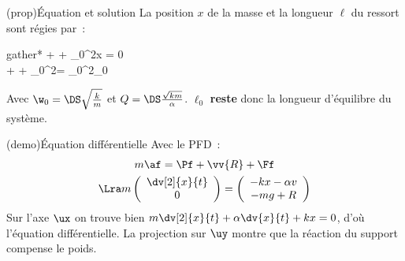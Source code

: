 \documentclass[../../main/main.tex]{subfiles}
\begin{document}
\begin{tcbraster}[raster columns=2, raster equal height=rows]
	\begin{tcb}[label=prop:eqdiffreslibre](prop){Équation et solution}
		La position $x$ de la masse et la longueur $\ell$ du ressort sont régies
		par~:

		\begin{empheq}[box=\fbox]{gather*}
			 +   + \w_0{}^2x = 0\\
			\Lra {} +
			  + \w_0{}^2\ell = \w_0{}^2\ell_0
		\end{empheq}
		Avec $\w_0 = \DS \sqrt{\frac{k}{m}}$ et $Q = \DS
			\frac{\sqrt{km}}{\alpha}$. $\ell_0$ \textbf{reste} donc la longueur
		d'équilibre du système.
	\end{tcb}
	\begin{tcb}[label=demo:solreslibre](demo){Équation différentielle}
		Avec le PFD~:
		\begin{gather*}
			m\af = \Pf + \vv{R} + \Ff\\
			\Lra m\left(
			\begin{array}{c}
					\dv[2]{x}{t} \\
					0
				\end{array}
			\right)
			=
			\left(
			\begin{array}{c}
					-kx -\alpha v \\
					-mg + R
				\end{array}
			\right)
		\end{gather*}
		Sur l'axe $\ux$ on trouve bien $m \dv[2]{x}{t} + \alpha \dv{x}{t} + kx =
			0$, d'où l'équation différentielle. La projection sur $\uy$ montre que
		la réaction du support compense le poids.
	\end{tcb}
\end{tcbraster}
\end{document}
